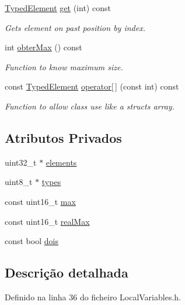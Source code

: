 \begin{DoxyCompactItemize}
\hyperlink{BasicTypes_8h_a97b332303b1262282599e6ede0637b82}{Typed\+Element} \hyperlink{classLocalVariables_a4abbb4a732d7dd0f11a147b79c15ae10}{get} (int) const
\begin{DoxyCompactList}\small\item\em Gets element on past position by index. \end{DoxyCompactList}\item 
int \hyperlink{classLocalVariables_acf8ee1db2a3427c30eb3e489d7a4478c}{obter\+Max} () const
\begin{DoxyCompactList}\small\item\em Function to know maximum size. \end{DoxyCompactList}\item 
const \hyperlink{BasicTypes_8h_a97b332303b1262282599e6ede0637b82}{Typed\+Element} \hyperlink{classLocalVariables_a6e978f3c992385f2909261e995105142}{operator\mbox{[}$\,$\mbox{]}} (const int) const
\begin{DoxyCompactList}\small\item\em Function to allow class use like a struct\textquotesingle{}s array. \end{DoxyCompactList}\end{DoxyCompactItemize}
\subsection*{Atributos Privados}
\begin{DoxyCompactItemize}
\item 
uint32\+\_\+t $\ast$ \hyperlink{classLocalVariables_a0015e9d8a61d4643f6f3594785467ae4}{elements}
\item 
uint8\+\_\+t $\ast$ \hyperlink{classLocalVariables_ac73d4583cc3f8b295c8c986cee21fe30}{types}
\item 
const uint16\+\_\+t \hyperlink{classLocalVariables_a55f33aaf9a0af5176d460616402c4aeb}{max}
\item 
const uint16\+\_\+t \hyperlink{classLocalVariables_a892e685ce3c1c5e6da9e1db542d865e9}{real\+Max}
\item 
const bool \hyperlink{classLocalVariables_a8357edb6ae793a8f031ae3733751e1fc}{dois}
\end{DoxyCompactItemize}


\subsection{Descrição detalhada}


Definido na linha 36 do ficheiro Local\+Variables.\+h.



